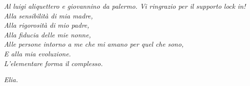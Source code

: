 \thispagestyle{empty}
\vspace*{4cm}
\noindent \begin{flushright}
\textit{Al luigi aliquettero e giovannino da palermo. Vi ringrazio per il supporto lock in!\\}
\vspace{1em} 
\textit{Alla sensibilità di mia madre,\\Alla rigorosità di mio padre,\\Alla fiducia delle mie nonne,\\Alle persone intorno a me che mi amano per quel che sono,\\E alla mia evoluzione.\\}
\vspace{1em} 
\textit{L'elementare forma il complesso.}
\par\end{flushright}
\vspace*{1cm}
\noindent \begin{flushright}
\par\end{flushright}
\noindent \begin{flushright}
\textit{Elia.}
\par\end{flushright}
\vspace*{\fill}
\pagebreak{}